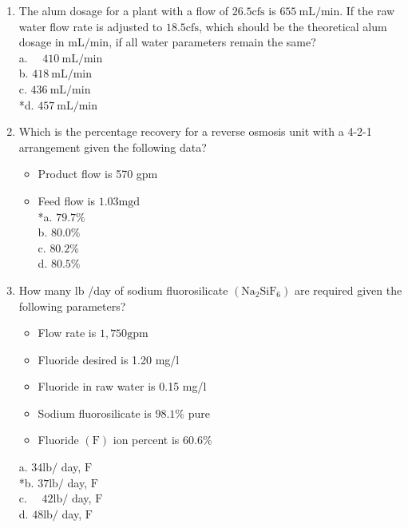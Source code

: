 \begin{enumerate}
  \item The alum dosage for a plant with a flow of $26.5 \mathrm{cfs}$ is $655 \mathrm{~mL} / \mathrm{min}$. If the raw water flow rate is adjusted to $18.5 \mathrm{cfs}$, which should be the theoretical alum dosage in $\mathrm{mL} / \mathrm{min}$, if all water parameters remain the same?\\
a. $\quad 410 \mathrm{~mL} / \mathrm{min}$\\
b. $418 \mathrm{~mL} / \mathrm{min}$\\
c. $436 \mathrm{~mL} / \mathrm{min}$\\
*d. $457 \mathrm{~mL} / \mathrm{min}$\\
  \item Which is the percentage recovery for a reverse osmosis unit with a 4-2-1 arrangement given the following data?\\

\begin{itemize}
  \item Product flow is 570 gpm\\
  \item Feed flow is $1.03 \mathrm{mgd}$\\
*a. $79.7 \%$\\
b. $80.0 \%$\\
c. $80.2 \%$\\
d. $80.5 \%$\\
\end{itemize}

  \item How many $\mathrm{lb}$ /day of sodium fluorosilicate $\left(\mathrm{Na}_{2} \mathrm{SiF}_{6}\right)$ are required given the following parameters?\\

\begin{itemize}
  \item Flow rate is $1,750 \mathrm{gpm}$\\
  \item Fluoride desired is 1.20 mg/l\\
  \item Fluoride in raw water is 0.15 mg/l\\
  \item Sodium fluorosilicate is $98.1 \%$ pure\\
  \item Fluoride $(\mathrm{F})$ ion percent is $60.6 \%$\\
  \end{itemize}
a. $34 \mathrm{lb} /$ day, $\mathrm{F}$\\
*b. $37 \mathrm{lb} /$ day, $\mathrm{F}$\\
c. $\quad 42 \mathrm{lb} /$ day, $\mathrm{F}$\\
d. $48 \mathrm{lb} /$ day, $\mathrm{F}$\\



\end{enumerate}
